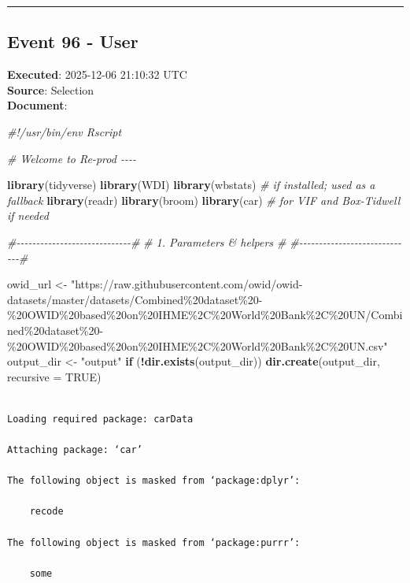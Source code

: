\documentclass[
  11pt,
]{article}
\newenvironment{Shaded}{\begin{snugshade}}{\end{snugshade}}
\newcommand{\AttributeTok}[1]{\textcolor[rgb]{0.13,0.29,0.53}{#1}}
\newcommand{\CommentTok}[1]{\textcolor[rgb]{0.56,0.35,0.01}{\textit{#1}}}
\newcommand{\ConstantTok}[1]{\textcolor[rgb]{0.56,0.35,0.01}{#1}}
\newcommand{\ControlFlowTok}[1]{\textcolor[rgb]{0.13,0.29,0.53}{\textbf{#1}}}
\newcommand{\FunctionTok}[1]{\textcolor[rgb]{0.13,0.29,0.53}{\textbf{#1}}}
\newcommand{\NormalTok}[1]{#1}
\newcommand{\OtherTok}[1]{\textcolor[rgb]{0.56,0.35,0.01}{#1}}
\newcommand{\SpecialCharTok}[1]{\textcolor[rgb]{0.81,0.36,0.00}{\textbf{#1}}}
\newcommand{\StringTok}[1]{\textcolor[rgb]{0.31,0.60,0.02}{#1}}
\newenvironment{rpoutput}{\vspace{0.5em}\begin{snugshade}}{\end{snugshade}}
\begin{document}
\begin{center}\rule{0.5\linewidth}{0.5pt}\end{center}

\subsection{Event 96 - User}\label{event-96---user}

\textbf{Executed}: 2025-12-06 21:10:32 UTC\\
\textbf{Source}: Selection\\
\textbf{Document}:

\begin{Shaded}
\begin{Highlighting}[]
\CommentTok{\#!/usr/bin/env Rscript}

\CommentTok{\# Welcome to Re{-}prod {-}{-}{-}{-}}

\FunctionTok{library}\NormalTok{(tidyverse)}
\FunctionTok{library}\NormalTok{(WDI)}
\FunctionTok{library}\NormalTok{(wbstats)       }\CommentTok{\# if installed; used as a fallback}
\FunctionTok{library}\NormalTok{(readr)}
\FunctionTok{library}\NormalTok{(broom)}
\FunctionTok{library}\NormalTok{(car)          }\CommentTok{\# for VIF and Box{-}Tidwell if needed}

\CommentTok{\#{-}{-}{-}{-}{-}{-}{-}{-}{-}{-}{-}{-}{-}{-}{-}{-}{-}{-}{-}{-}{-}{-}{-}{-}{-}{-}{-}{-}{-}\#}
\CommentTok{\# 1. Parameters \& helpers     \#}
\CommentTok{\#{-}{-}{-}{-}{-}{-}{-}{-}{-}{-}{-}{-}{-}{-}{-}{-}{-}{-}{-}{-}{-}{-}{-}{-}{-}{-}{-}{-}{-}\#}

\NormalTok{owid\_url }\OtherTok{\textless{}{-}} \StringTok{"https://raw.githubusercontent.com/owid/owid{-}datasets/master/datasets/Combined\%20dataset\%20{-}\%20OWID\%20based\%20on\%20IHME\%2C\%20World\%20Bank\%2C\%20UN/Combined\%20dataset\%20{-}\%20OWID\%20based\%20on\%20IHME\%2C\%20World\%20Bank\%2C\%20UN.csv"}
\NormalTok{output\_dir }\OtherTok{\textless{}{-}} \StringTok{"output"}
\ControlFlowTok{if}\NormalTok{ (}\SpecialCharTok{!}\FunctionTok{dir.exists}\NormalTok{(output\_dir)) }\FunctionTok{dir.create}\NormalTok{(output\_dir, }\AttributeTok{recursive =} \ConstantTok{TRUE}\NormalTok{)}
\end{Highlighting}
\end{Shaded}

\begin{rpoutput}

\begin{verbatim}

Loading required package: carData

Attaching package: ‘car’

The following object is masked from ‘package:dplyr’:

    recode

The following object is masked from ‘package:purrr’:

    some
\end{verbatim}

\end{rpoutput}
\end{document}
